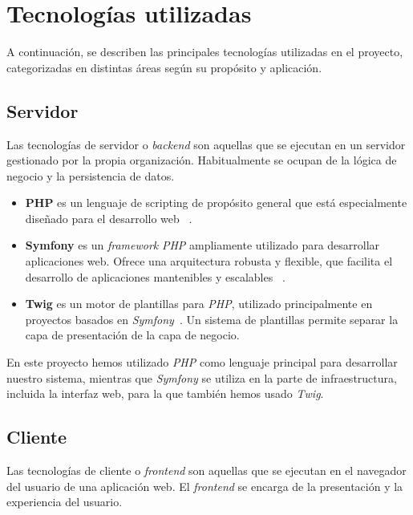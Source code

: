 \section{Tecnologías utilizadas}\label{sec:tecnologias_utilizadas}

A continuación, se describen las principales tecnologías utilizadas en el proyecto, categorizadas en distintas áreas
según su propósito y aplicación.

\subsection*{Servidor}

Las tecnologías de servidor o \textit{backend} son aquellas que se ejecutan en un servidor gestionado por la propia
organización.
Habitualmente se ocupan de la lógica de negocio y la persistencia de datos.

\begin{itemize}
    \item
    \textbf{PHP} es un lenguaje de scripting de propósito general que está especialmente diseñado para el desarrollo
    web ~\cite{url_php}.

    \item
    \textbf{Symfony} es un \textit{framework} \textit{PHP} ampliamente utilizado para desarrollar aplicaciones web.
    Ofrece una arquitectura robusta y flexible, que facilita el desarrollo de aplicaciones mantenibles y escalables
    ~\cite{url_symfony}.

    \item
    \textbf{Twig} es un motor de plantillas para \textit{PHP}, utilizado principalmente en proyectos basados en
    \textit{Symfony}~\cite{url_twig}.
    Un sistema de plantillas permite separar la capa de presentación de la capa de negocio.
\end{itemize}

En este proyecto hemos utilizado \textit{PHP} como lenguaje principal para desarrollar nuestro sistema, mientras que
\textit{Symfony} se utiliza en la parte de infraestructura, incluida la interfaz web, para la que también hemos usado
\textit{Twig}.

\subsection*{Cliente}

Las tecnologías de cliente o \textit{frontend} son aquellas que se ejecutan en el navegador del usuario de una
aplicación web.
El \textit{frontend} se encarga de la presentación y la experiencia del usuario.

